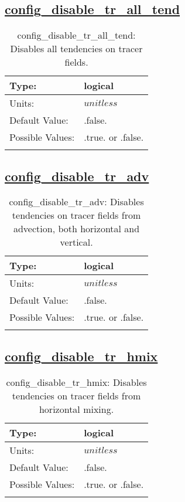 \subsection[config\_disable\_tr\_all\_tend]{\hyperref[sec:nm_tab_debug]{config\_disable\_tr\_all\_tend}}
\label{subsec:nm_sec_config_disable_tr_all_tend}
\begin{center}
\begin{longtable}{| p{2.0in} | p{4.0in} |}
    \hline
    Type: & logical \\
    \hline
    Units: & $unitless$ \\
    \hline
    Default Value: & .false. \\
    \hline
    Possible Values: & .true. or .false. \\
    \hline
    \caption{config\_disable\_tr\_all\_tend: Disables all tendencies on tracer fields.}
\end{longtable}
\end{center}
\subsection[config\_disable\_tr\_adv]{\hyperref[sec:nm_tab_debug]{config\_disable\_tr\_adv}}
\label{subsec:nm_sec_config_disable_tr_adv}
\begin{center}
\begin{longtable}{| p{2.0in} | p{4.0in} |}
    \hline
    Type: & logical \\
    \hline
    Units: & $unitless$ \\
    \hline
    Default Value: & .false. \\
    \hline
    Possible Values: & .true. or .false. \\
    \hline
    \caption{config\_disable\_tr\_adv: Disables tendencies on tracer fields from advection, both horizontal and vertical.}
\end{longtable}
\end{center}
\subsection[config\_disable\_tr\_hmix]{\hyperref[sec:nm_tab_debug]{config\_disable\_tr\_hmix}}
\label{subsec:nm_sec_config_disable_tr_hmix}
\begin{center}
\begin{longtable}{| p{2.0in} | p{4.0in} |}
    \hline
    Type: & logical \\
    \hline
    Units: & $unitless$ \\
    \hline
    Default Value: & .false. \\
    \hline
    Possible Values: & .true. or .false. \\
    \hline
    \caption{config\_disable\_tr\_hmix: Disables tendencies on tracer fields from horizontal mixing.}
\end{longtable}
\end{center}

